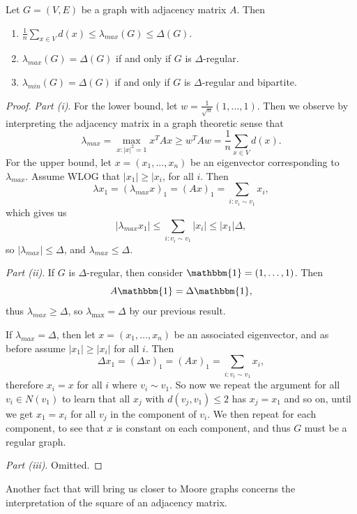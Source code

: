 \begin{proposition}
	Let $G = (V, E)$ be a graph with adjacency matrix $A$. Then
	\begin{enumerate}[label=(\roman*)]
		\item $\frac{1}{n}\sum_{x \in V} d(x) \leq \lambda_{max}(G) \leq \Delta(G)$.
		\item $\lambda_{max}(G) = \Delta(G)$ if and only if $G$ is $\Delta$-regular.
		\item $\lambda_{min}(G) = \Delta(G)$ if and only if $G$ is $\Delta$-regular and bipartite.
	\end{enumerate}
\end{proposition}
\begin{proof}
	\emph{Part (i)}. For the lower bound, let $w = \frac{1}{\sqrt{n}}(1, \dots, 1)$. Then we observe by interpreting the adjacency matrix in a graph theoretic sense that
	$$
	\lambda_{max} = \max_{x : |x|^2 = 1} x^T A x \geq w^T Aw = \frac{1}{n}\sum_{x \in V} d(x).
	$$
	For the upper bound, let $x = (x_1, \dots, x_n)$ be an eigenvector corresponding to $\lambda_{max}$. Assume WLOG that $|x_1| \geq |x_i$, for all $i$. Then
	$$
	\lambda x_1 = (\lambda_{max} x)_1 = (Ax)_1 = \sum_{i:v_i \sim v_1} x_i,
	$$
	which gives us
	$$
	|\lambda_{max} x_1| \leq \sum_{i: v_i \sim v_1} |x_i| \leq |x_1|\Delta,
	$$
	so $|\lambda_{max}| \leq \Delta$, and $\lambda_{max} \leq \Delta$.

	\emph{Part (ii)}. If $G$ is $\Delta$-regular, then consider $\mathbbm{1} = (1, \dots, 1)$. Then
	$$
A \mathbbm{1} = \Delta\mathbbm{1},
	$$
	thus $\lambda_{max} \geq \Delta$, so $\lambda_{\max} = \Delta$ by our previous result. 

	If $\lambda_{max} = \Delta$, then let $x = (x_1, \dots, x_n)$ be an associated eigenvector, and as before assume $|x_1| \geq |x_i|$ for all $i$. Then
	$$
	\Delta x_1 = (\Delta x)_1 = (Ax)_1 = \sum_{i:v_i \sim v_1} x_i,
	$$
	therefore $x_i = x$ for all $i$ where $v_i \sim v_1$. So now we repeat the argument for all $v_i \in N(v_1)$ to learn that all $x_j$ with $d(v_j, v_1) \leq 2$ has $x_j = x_1$ and so on, until we get $x_1 = x_i$ for all $v_j$ in the component of $v_i$. We then repeat for each component, to see that $x$ is constant on each component, and thus $G$ must be a regular graph.

	\emph{Part (iii)}. Omitted.
\end{proof}

Another fact that will bring us closer to Moore graphs concerns the interpretation of the square of an adjacency matrix.

